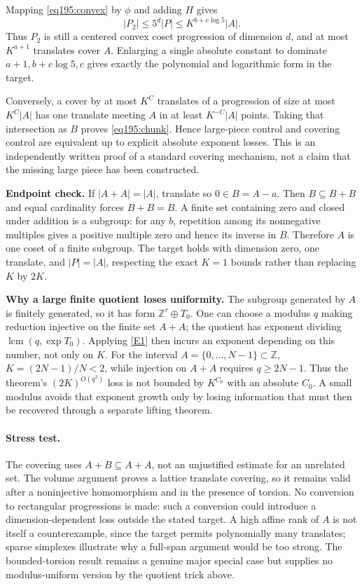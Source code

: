 \documentclass[11pt,a4paper]{article}
\newcommand{\Z}{\mathbb{Z}}
\newcommand{\eref}[2]{\hyperlink{extra:#1:#2}{[E#2]}}
\numberwithin{equation}{section}
\begin{document}
Mapping \eqref{eq195:convex} by $\phi$ and adding $H$ gives
\[
 |P_2|\le5^d|P|\le K^{b+c\log5}|A|.
\]
Thus $P_2$ is still a centered convex coset progression of dimension $d$, and at most $K^{a+1}$ translates cover $A$. Enlarging a single absolute constant to dominate $a+1,b+c\log5,c$ gives exactly the polynomial and logarithmic form in the target.

Conversely, a cover by at most $K^C$ translates of a progression of size at most $K^C|A|$ has one translate meeting $A$ in at least $K^{-C}|A|$ points. Taking that intersection as $B$ proves \eqref{eq195:chunk}. Hence large-piece control and covering control are equivalent up to explicit absolute exponent losses. This is an independently written proof of a standard covering mechanism, not a claim that the missing large piece has been constructed.

\textbf{Endpoint check.} If $|A+A|=|A|$, translate so $0\in B=A-a$. Then $B\subseteq B+B$ and equal cardinality forces $B+B=B$. A finite set containing zero and closed under addition is a subgroup: for any $b$, repetition among its nonnegative multiples gives a positive multiple zero and hence its inverse in $B$. Therefore $A$ is one coset of a finite subgroup. The target holds with dimension zero, one translate, and $|P|=|A|$, respecting the exact $K=1$ bounds rather than replacing $K$ by $2K$.

\textbf{Why a large finite quotient loses uniformity.} The subgroup generated by $A$ is finitely generated, so it has form $\Z^r\oplus T_0$. One can choose a modulus $q$ making reduction injective on the finite set $A+A$; the quotient has exponent dividing $\operatorname{lcm}(q,\exp T_0)$. Applying \eref{statement}{1} then incurs an exponent depending on this number, not only on $K$. For the interval $A=\{0,\ldots,N-1\}\subset\Z$, $K=(2N-1)/N<2$, while injection on $A+A$ requires $q\ge2N-1$. Thus the theorem's $(2K)^{O(q^3)}$ loss is not bounded by $K^{C_0}$ with an absolute $C_0$. A small modulus avoids that exponent growth only by losing information that must then be recovered through a separate lifting theorem.

\paragraph{Stress test.}
The covering uses $A+B\subseteq A+A$, not an unjustified estimate for an unrelated set. The volume argument proves a lattice translate covering, so it remains valid after a noninjective homomorphism and in the presence of torsion. No conversion to rectangular progressions is made: such a conversion could introduce a dimension-dependent loss outside the stated target. A high affine rank of $A$ is not itself a counterexample, since the target permits polynomially many translates; sparse simplexes illustrate why a full-span argument would be too strong. The bounded-torsion result remains a genuine major special case but supplies no modulus-uniform version by the quotient trick above.
\end{document}
